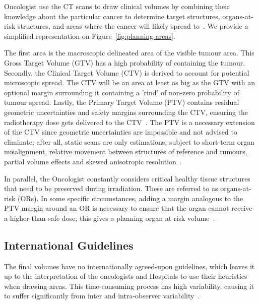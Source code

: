 \documentclass[12pt,twoside]{report}
\begin{document}
Oncologist use the CT scans to draw clinical volumes by combining their knowledge about the particular cancer to determine target structures, organs-at-risk structures, and areas where the cancer will likely spread to~\cite{AMLART-data}. We provide a simplified representation on Figure~\ref{fig:planning-areas}.

The first area is the macroscopic delineated area of the visible tumour area. This Gross Target Volume (GTV) has a high probability of containing the tumour. Secondly, the Clinical Target Volume (CTV) is derived to account for potential microscopic spread. The CTV will be an area at least as big as the GTV with an optional margin surrounding it containing a 'rind' of non-zero probability of tumour spread. Lastly, the Primary Target Volume (PTV) contains residual geometric uncertainties and safety margins surrounding the CTV, ensuring the radiotherapy dose gets delivered to the CTV~\cite{tumor-delineation,defining-target-volumes,Lin2021-oz,personalised-PTV-strategies}. The PTV is a necessary extension of the CTV since geometric uncertainties are impossible and not advised to eliminate; after all, static scans are only estimations, subject to short-term organ misalignment, relative movement between structures of reference and tumours, partial volume effects and skewed anisotropic resolution~\cite{VANHERK200452}.

In parallel, the Oncologist constantly considers critical healthy tissue structures that need to be preserved during irradiation. These are referred to as organs-at-risk (ORs). In some specific circumstances, adding a margin analogous to the PTV margin around an OR is necessary to ensure that the organ cannot receive a higher-than-safe dose; this gives a planning organ at risk volume~\cite{defining-target-volumes}.

\subsection{International Guidelines}

The final volumes have no internationally agreed-upon guidelines, which leaves it up to the interpretation of the oncologists and Hospitals to use their heuristics when drawing areas. This time-consuming process has high variability, causing it to suffer significantly from inter and intra-observer variability~\cite{Lin2021-oz}. 

\end{document}
